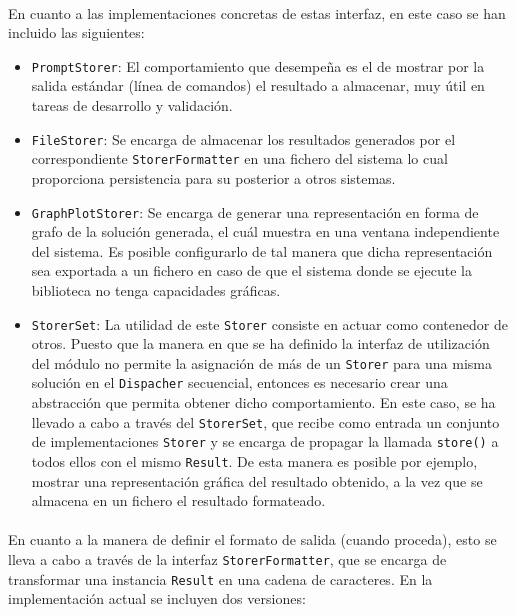 \documentclass{subfiles}
\begin{document}
          \paragraph{}
          En cuanto a las implementaciones concretas de estas interfaz, en este caso se han incluido las siguientes:

          \begin{itemize}

            \item \texttt{PromptStorer}: El comportamiento que desempeña es el de mostrar por la salida estándar (línea de comandos) el resultado a almacenar, muy útil en tareas de desarrollo y validación.

            \item \texttt{FileStorer}: Se encarga de almacenar los resultados generados por el correspondiente \texttt{StorerFormatter} en una fichero del sistema lo cual proporciona persistencia para su posterior a otros sistemas.

            \item \texttt{GraphPlotStorer}: Se encarga de generar una representación en forma de grafo de la solución generada, el cuál muestra en una ventana independiente del sistema. Es posible configurarlo de tal manera que dicha representación sea exportada a un fichero en caso de que el sistema donde se ejecute la biblioteca no tenga capacidades gráficas.

            \item \texttt{StorerSet}: La utilidad de este \texttt{Storer} consiste en actuar como contenedor de otros. Puesto que la manera en que se ha definido la interfaz de utilización del módulo no permite la asignación de más de un \texttt{Storer} para una misma solución en el \texttt{Dispacher} secuencial, entonces es necesario crear una abstracción que permita obtener dicho comportamiento. En este caso, se ha llevado a cabo a través del \texttt{StorerSet}, que recibe como entrada un conjunto de implementaciones \texttt{Storer} y se encarga de propagar la llamada \verb|store()| a todos ellos con el mismo \texttt{Result}. De esta manera es posible por ejemplo, mostrar una representación gráfica del resultado obtenido, a la vez que se almacena en un fichero el resultado formateado.

          \end{itemize}

          \paragraph{}
          En cuanto a la manera de definir el formato de salida (cuando proceda), esto se lleva a cabo a través de la interfaz \texttt{StorerFormatter}, que se encarga de transformar una instancia \texttt{Result} en una cadena de caracteres. En la implementación actual se incluyen dos versiones:
\end{document}
